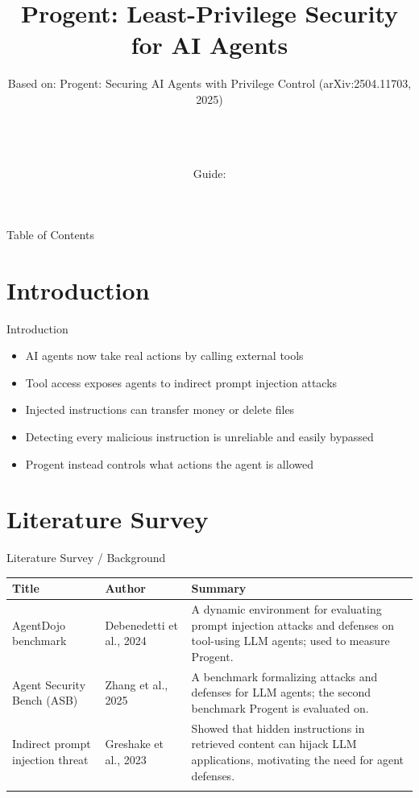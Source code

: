 \documentclass[10pt]{beamer}
\title[B.Tech Seminar]{Progent: Least-Privilege Security for AI Agents}
\subtitle{Based on: Progent: Securing AI Agents with Privilege Control (arXiv:2504.11703, 2025)}
\author[\studentname\ (\shortinst)]{\studentname \\ \small \rollno \\ \small \rollclass \\ \small Guide: \guidename}
\institute[]{\deptname \\ \collegename}
\date{\seminardate}
\begin{document}
\begin{frame}[plain]
  \titlepage
\end{frame}

\begin{frame}{Table of Contents}
  \tableofcontents
\end{frame}

\section{Introduction}
\begin{frame}{Introduction}
\begin{itemize}
  \item AI agents now take real actions by calling external tools
  \item Tool access exposes agents to indirect prompt injection attacks
  \item Injected instructions can transfer money or delete files
  \item Detecting every malicious instruction is unreliable and easily bypassed
  \item Progent instead controls what actions the agent is allowed
\end{itemize}
\end{frame}

\section{Literature Survey}
\begin{frame}{Literature Survey / Background}
  \small
  \begin{tabular}{@{}p{2.7cm}p{2.3cm}p{5.6cm}@{}}
    \toprule
    \textbf{Title} & \textbf{Author} & \textbf{Summary} \\
    \midrule
    AgentDojo benchmark & Debenedetti et al., 2024 & A dynamic environment for evaluating prompt injection attacks and defenses on tool-using LLM agents; used to measure Progent. \\
    \addlinespace
    Agent Security Bench (ASB) & Zhang et al., 2025 & A benchmark formalizing attacks and defenses for LLM agents; the second benchmark Progent is evaluated on. \\
    \addlinespace
    Indirect prompt injection threat & Greshake et al., 2023 & Showed that hidden instructions in retrieved content can hijack LLM applications, motivating the need for agent defenses. \\
    \addlinespace
    \bottomrule
  \end{tabular}
\end{frame}
\end{document}
